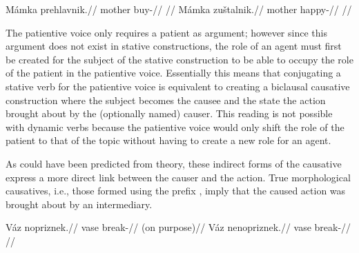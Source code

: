 \pex
\a
\begingl
    \gla \ljudge{*}Mámka prehlavnik.//
    \glb mother buy-//
    \glft {}//
\endgl
\a
\begingl
    \gla Mámka zuštalnik.//
    \glb mother happy-//
    \glft {}//
\endgl
\xe

The patientive voice only requires a patient as argument; however since this argument does not exist in stative constructions, the role of an agent must first be created for the subject of the stative construction to be able to occupy the role of the patient in the patientive voice. Essentially this means that conjugating a stative verb for the patientive voice is equivalent to creating a biclausal causative construction where the subject becomes the causee and the state the action brought about by the (optionally named) causer. This reading is not possible with dynamic verbs because the patientive voice would only shift the role of the patient to that of the topic without having to create a new role for an agent.

As could have been predicted from  theory, these indirect forms of the causative express a more direct link between the causer and the action. True morphological causatives, i.e., those formed using the prefix , imply that the caused action was brought about by an intermediary.

\begin{multicols}{2}
\pex
\a
\begingl
\gla Váz nopriznek.//
\glb vase break-//
\glft {} (on purpose)//
\endgl
\a
\begingl
\gla Váz nenopriznek.//
\glb vase break-//
\glft {}//
\endgl
\xe
\end{multicols}

